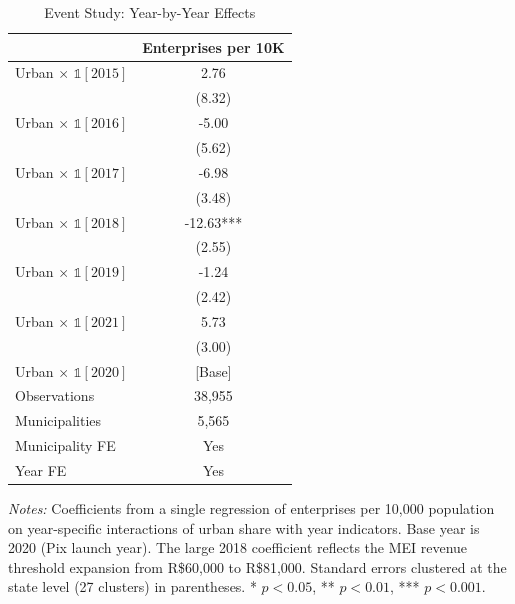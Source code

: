 \begin{table}[htbp]
\centering
\caption{Event Study: Year-by-Year Effects}
\label{tab:event}
\begin{tabular}{lc}
\toprule
 & Enterprises per 10K \\
\midrule
Urban $\times$ $\mathbb{1}[2015]$ & 2.76 \\
 & (8.32) \\
Urban $\times$ $\mathbb{1}[2016]$ & -5.00 \\
 & (5.62) \\
Urban $\times$ $\mathbb{1}[2017]$ & -6.98 \\
 & (3.48) \\
Urban $\times$ $\mathbb{1}[2018]$ & -12.63*** \\
 & (2.55) \\
Urban $\times$ $\mathbb{1}[2019]$ & -1.24 \\
 & (2.42) \\
Urban $\times$ $\mathbb{1}[2021]$ & 5.73 \\
 & (3.00) \\
Urban $\times$ $\mathbb{1}[2020]$ & [Base] \\
\midrule
Observations & 38,955 \\
Municipalities & 5,565 \\
Municipality FE & Yes \\
Year FE & Yes \\
\bottomrule
\end{tabular}
\begin{tablenotes}
\item \textit{Notes:} Coefficients from a single regression of enterprises per 10,000 population on year-specific interactions of urban share with year indicators. Base year is 2020 (Pix launch year). The large 2018 coefficient reflects the MEI revenue threshold expansion from R\$60,000 to R\$81,000. Standard errors clustered at the state level (27 clusters) in parentheses. * $p < 0.05$, ** $p < 0.01$, *** $p < 0.001$.
\end{tablenotes}
\end{table}

